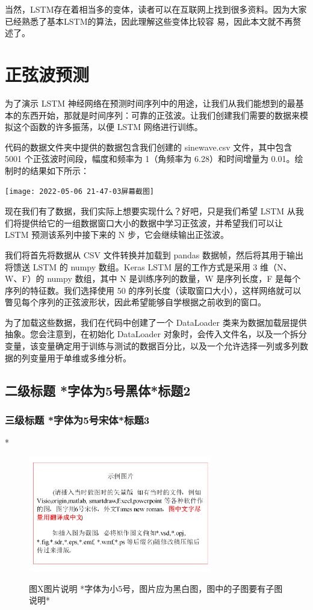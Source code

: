 \documentclass[10.5pt,compsoc]{CjC}
\theoremstyle{mystyle}
\begin{document}
当然，LSTM存在着相当多的变体，读者可以在互联网上找到很多资料。因为大家已经熟悉了基本LSTM的算法，因此理解这些变体比较容 易，因此本文就不再赘述了。\\

\section{正弦波预测}
为了演示 LSTM 神经网络在预测时间序列中的用途，让我们从我们能想到的最基本的东西开始，那就是时间序列：可靠的正弦波。让我们创建我们需要的数据来模拟这个函数的许多振荡，以便 LSTM 网络进行训练。

代码的数据文件夹中提供的数据包含我们创建的 sinewave.csv 文件，其中包含 5001 个正弦波时间段，幅度和频率为 1（角频率为 6.28）和时间增量为 0.01。绘制时的结果如下所示：

\texttt{[image: 2022-05-06 21-47-03屏幕截图]}

现在我们有了数据，我们实际上想要实现什么？好吧，只是我们希望 LSTM 从我们将提供给它的一组数据窗口大小的数据中学习正弦波，并希望我们可以让 LSTM 预测该系列中接下来的 N 步，它会继续输出正弦波。

我们将首先将数据从 CSV 文件转换并加载到 pandas 数据帧，然后将其用于输出将馈送 LSTM 的 numpy 数组。Keras LSTM 层的工作方式是采用 3 维（N、W、F）的 numpy 数组，其中 N 是训练序列的数量，W 是序列长度，F 是每个序列的特征数。我们选择使用 50 的序列长度（读取窗口大小），这样网络就可以瞥见每个序列的正弦波形状，因此希望能够自学根据之前收到的窗口。

为了加载这些数据，我们在代码中创建了一个 DataLoader 类来为数据加载层提供抽象。您会注意到，在初始化 DataLoader 对象时，会传入文件名，以及一个拆分变量，该变量确定用于训练与测试的数据百分比，以及一个允许选择一列或多列数据的列变量用于单维或多维分析。

{\heiti \subsection{二级标题 *字体为5号黑体*标题2} }
\subsubsection{三级标题 *字体为5号宋体*标题3}
*
\begin{figure}[htbp]
\centerline{\includegraphics[width=3.15in,height=1.98in]{CJC1.pdf}}
图X\quad  图片说明 *字体为小5号，图片应为黑白图，图中的子图要有子图说明*
\label{fig1}
\end{figure}
\end{document}
